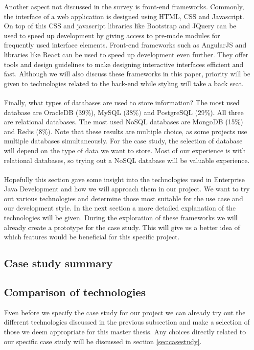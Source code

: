 \documentclass[12pt]{article}
\begin{document}
\begin{multicols}{2}
Another aspect not discussed in the survey is front-end frameworks. Commonly, the interface of a web application is designed using HTML, CSS and Javascript. On top of this CSS and javascript libraries like Bootstrap and JQuery can be used to speed up development by giving access to pre-made modules for frequently used interface elements. Front-end frameworks such as AngularJS and libraries like React can be used to speed up development even further. They offer tools and design guidelines to make designing interactive interfaces efficient and fast. Although we will also discuss these frameworks in this paper, priority will be given to technologies related to the back-end while styling will take a back seat.
\\\\
Finally, what types of databases are used to store information? The most used database are OracleDB (39\%), MySQL (38\%) and PostgreSQL (29\%). All three are relational databases. The most used NoSQL databases are MongoDB (15\%) and Redis (8\%). Note that these results are multiple choice, as some projects use multiple databases simultaneously. For the case study, the selection of database will depend on the type of data we want to store. Most of our experience is with relational databases, so trying out a NoSQL database will be valuable experience.
\\\\
Hopefully this section gave some insight into the technologies used in Enterprise Java Development and how we will approach them in our project. We want to try out various technologies and determine those most suitable for the use case and our development style. In the next section a more detailed explanation of the technologies will be given. During the exploration of these frameworks we will already create a prototype for the case study. This will give us a better idea of which features would be beneficial for this specific project.

\subsection{Case study summary}
\subsection{Comparison of technologies}
Even before we specify the case study for our project we can already try out the different technologies discussed in the previous subsection and make a selection of those we deem appropriate for this master thesis. Any choices directly related to our specific case study will be discussed in section \ref{sec:casestudy}.

\end{multicols}
\end{document}
